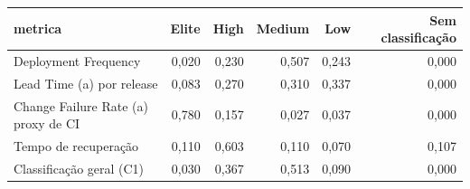 \begin{tabular}{lrrrrr}
\hline
metrica & Elite & High & Medium & Low & Sem classificação \\
\hline
Deployment Frequency & 0,020 & 0,230 & 0,507 & 0,243 & 0,000 \\
Lead Time (a) por release & 0,083 & 0,270 & 0,310 & 0,337 & 0,000 \\
Change Failure Rate (a) proxy de CI & 0,780 & 0,157 & 0,027 & 0,037 & 0,000 \\
Tempo de recuperação & 0,110 & 0,603 & 0,110 & 0,070 & 0,107 \\
Classificação geral (C1) & 0,030 & 0,367 & 0,513 & 0,090 & 0,000 \\
\hline
\end{tabular}
